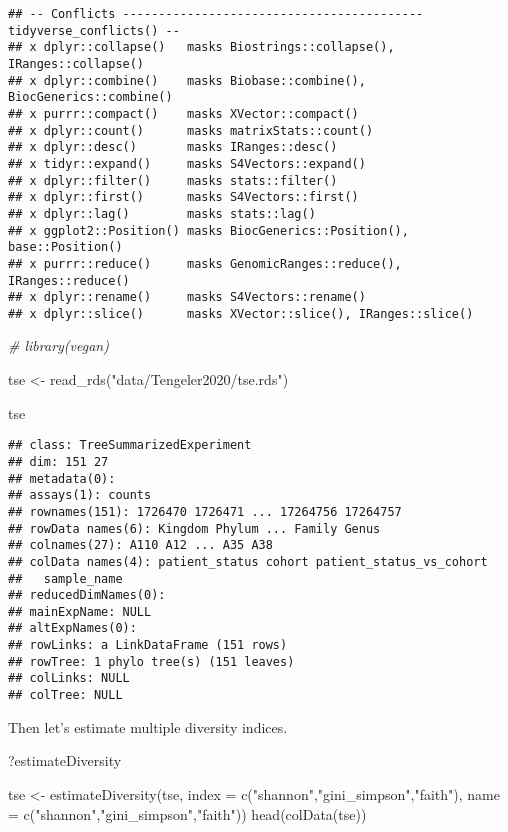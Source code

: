 \documentclass[
  oneside]{book}
\newenvironment{Shaded}{\begin{snugshade}}{\end{snugshade}}
\newcommand{\AttributeTok}[1]{\textcolor[rgb]{0.77,0.63,0.00}{#1}}
\newcommand{\CommentTok}[1]{\textcolor[rgb]{0.56,0.35,0.01}{\textit{#1}}}
\newcommand{\FunctionTok}[1]{\textcolor[rgb]{0.00,0.00,0.00}{#1}}
\newcommand{\NormalTok}[1]{#1}
\newcommand{\OtherTok}[1]{\textcolor[rgb]{0.56,0.35,0.01}{#1}}
\newcommand{\StringTok}[1]{\textcolor[rgb]{0.31,0.60,0.02}{#1}}
\begin{document}
\begin{verbatim}
## -- Conflicts ------------------------------------------ tidyverse_conflicts() --
## x dplyr::collapse()   masks Biostrings::collapse(), IRanges::collapse()
## x dplyr::combine()    masks Biobase::combine(), BiocGenerics::combine()
## x purrr::compact()    masks XVector::compact()
## x dplyr::count()      masks matrixStats::count()
## x dplyr::desc()       masks IRanges::desc()
## x tidyr::expand()     masks S4Vectors::expand()
## x dplyr::filter()     masks stats::filter()
## x dplyr::first()      masks S4Vectors::first()
## x dplyr::lag()        masks stats::lag()
## x ggplot2::Position() masks BiocGenerics::Position(), base::Position()
## x purrr::reduce()     masks GenomicRanges::reduce(), IRanges::reduce()
## x dplyr::rename()     masks S4Vectors::rename()
## x dplyr::slice()      masks XVector::slice(), IRanges::slice()
\end{verbatim}

\begin{Shaded}
\begin{Highlighting}[]
\CommentTok{\# library(vegan)}

\NormalTok{tse }\OtherTok{\textless{}{-}} \FunctionTok{read\_rds}\NormalTok{(}\StringTok{"data/Tengeler2020/tse.rds"}\NormalTok{)}

\NormalTok{tse}
\end{Highlighting}
\end{Shaded}

\begin{verbatim}
## class: TreeSummarizedExperiment 
## dim: 151 27 
## metadata(0):
## assays(1): counts
## rownames(151): 1726470 1726471 ... 17264756 17264757
## rowData names(6): Kingdom Phylum ... Family Genus
## colnames(27): A110 A12 ... A35 A38
## colData names(4): patient_status cohort patient_status_vs_cohort
##   sample_name
## reducedDimNames(0):
## mainExpName: NULL
## altExpNames(0):
## rowLinks: a LinkDataFrame (151 rows)
## rowTree: 1 phylo tree(s) (151 leaves)
## colLinks: NULL
## colTree: NULL
\end{verbatim}

Then let's estimate multiple diversity indices.

\begin{Shaded}
\begin{Highlighting}[]
\NormalTok{?estimateDiversity}

\NormalTok{tse }\OtherTok{\textless{}{-}} \FunctionTok{estimateDiversity}\NormalTok{(tse, }
                              \AttributeTok{index =} \FunctionTok{c}\NormalTok{(}\StringTok{"shannon"}\NormalTok{,}\StringTok{"gini\_simpson"}\NormalTok{,}\StringTok{"faith"}\NormalTok{),}
                              \AttributeTok{name =} \FunctionTok{c}\NormalTok{(}\StringTok{"shannon"}\NormalTok{,}\StringTok{"gini\_simpson"}\NormalTok{,}\StringTok{"faith"}\NormalTok{))}
\FunctionTok{head}\NormalTok{(}\FunctionTok{colData}\NormalTok{(tse))}
\end{Highlighting}
\end{Shaded}
\end{document}
